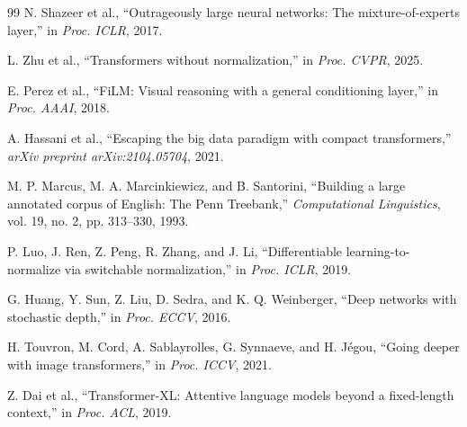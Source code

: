 \documentclass[final,3p,times,twocolumn]{elsarticle}
\begin{document}
\begin{thebibliography}{99}
N. Shazeer et al., ``Outrageously large neural networks: The
mixture-of-experts layer,'' in \textit{Proc. ICLR}, 2017.

L. Zhu et al., ``Transformers without normalization,'' in
\textit{Proc. CVPR}, 2025.

E. Perez et al., ``FiLM: Visual reasoning with a general conditioning
layer,'' in \textit{Proc. AAAI}, 2018.

A. Hassani et al., ``Escaping the big data paradigm with compact
transformers,'' \textit{arXiv preprint arXiv:2104.05704}, 2021.

M. P. Marcus, M. A. Marcinkiewicz, and B. Santorini, ``Building a
large annotated corpus of English: The Penn Treebank,''
\textit{Computational Linguistics}, vol. 19, no. 2, pp. 313--330,
1993.

P. Luo, J. Ren, Z. Peng, R. Zhang, and J. Li, ``Differentiable
learning-to-normalize via switchable normalization,'' in \textit{Proc.
ICLR}, 2019.

G. Huang, Y. Sun, Z. Liu, D. Sedra, and K. Q. Weinberger, ``Deep
networks with stochastic depth,'' in \textit{Proc. ECCV}, 2016.

H. Touvron, M. Cord, A. Sablayrolles, G. Synnaeve, and H. J{\'e}gou,
``Going deeper with image transformers,'' in \textit{Proc. ICCV}, 2021.

Z. Dai et al., ``Transformer-XL: Attentive language models beyond a
fixed-length context,'' in \textit{Proc. ACL}, 2019.

\end{thebibliography}
\end{document}
